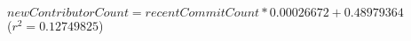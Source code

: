 $\mathit{newContributorCount} = \mathit{recentCommitCount} * 0.00026672 + 0.48979364$\\($r^2 = 0.12749825$)